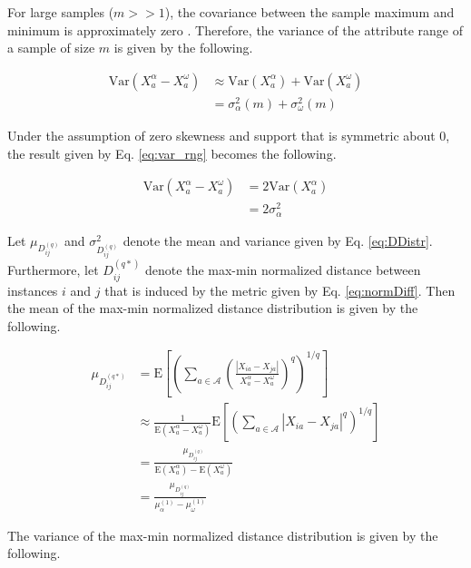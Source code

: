 \documentclass[10pt,letterpaper]{article}\usepackage[]{graphicx}\usepackage[]{color}
\begin{document}
For large samples ($m >> 1$), the covariance between the sample maximum and minimum is approximately zero \cite{gumbel1947}. Therefore, the variance of the attribute range of a sample of size $m$ is given by the following.

\begin{equation}\label{eq:var_rng}
\begin{aligned}
\text{Var}(X^\alpha_a - X^\omega_a) &\approx \text{Var}(X^\alpha_a) + \text{Var}(X^\omega_a) \\
&= \sigma^2_\alpha(m) + \sigma^2_\omega(m)
\end{aligned}
\end{equation}

Under the assumption of zero skewness and support that is symmetric about 0, the result given by Eq. \ref{eq:var_rng} becomes the following.

\begin{equation}\label{eq:var_rng_symm}
\begin{aligned}
\text{Var}(X^\alpha_a - X^\omega_a) &= 2 \text{Var}(X^\alpha_a) \\
&= 2 \sigma^2_\alpha
\end{aligned}
\end{equation}

Let $\mu_{D^{(q)}_{ij}}$ and $\sigma^2_{D^{(q)}_{ij}}$ denote the mean and variance given by Eq. \ref{eq:DDistr}. Furthermore, let $D^{(q*)}_{ij}$ denote the max-min normalized distance between instances $i$ and $j$ that is induced by the metric given by Eq. \ref{eq:normDiff}. Then the mean of the max-min normalized distance distribution is given by the following.

\begin{equation}\label{eq:max-min_D_mean}
\begin{aligned}
\mu_{D^{(q*)}_{ij}} &= \text{E}\left[\left(\sum_{a \in \mathcal{A}}\left(\frac{|X_{ia} - X_{ja}|}{X^\alpha_a - X^\omega_a}\right)^q\right)^{1/q}\right] \\
&\approx \frac{1}{\text{E}(X^\alpha_a - X^\omega_a)}\text{E}\left[\left(\sum_{a \in \mathcal{A}}|X_{ia} - X_{ja}|^q\right)^{1/q}\right] \\
&= \frac{\mu_{D^{(q)}_{ij}}}{\text{E}(X^\alpha_a) - \text{E}(X^\omega_a)} \\
&= \frac{\mu_{D^{(q)}_{ij}}}{\mu^{(1)}_\alpha - \mu^{(1)}_\omega}
\end{aligned}
\end{equation}

The variance of the max-min normalized distance distribution is given by the following.
\end{document}
